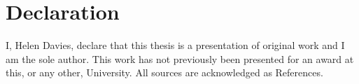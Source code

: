 
\chapter*{Declaration}

\begin{list}{}{%
  \setlength{\leftmargin}{2cm}%
  \setlength{\rightmargin}{2cm}%
}\item[]

I, Helen Davies, declare that this thesis is a presentation of original work and I am the sole author. This work has not previously been presented for an award at this, or any other, University. All sources are acknowledged as References.


\end{list}

